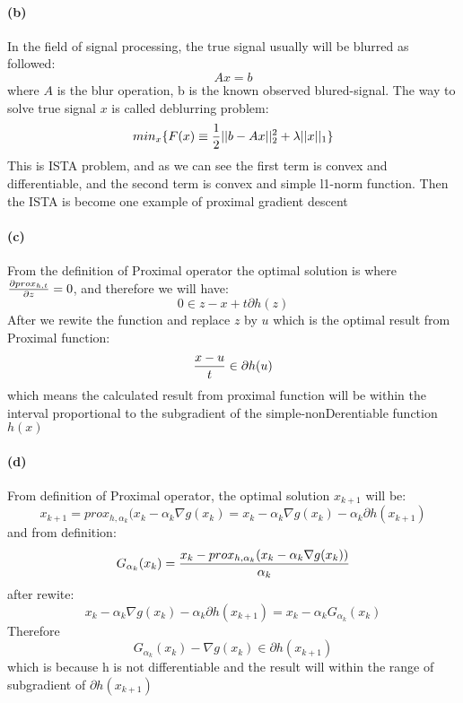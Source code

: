 \documentclass{article}
\begin{document}
\paragraph{(b)} In the field of signal processing, the true signal usually will be blurred as followed:
\begin{equation}
Ax = b
\end{equation}
where $A$ is the blur operation, b is the known observed blured-signal. The way to solve true signal $x$ is called deblurring problem:
\begin{equation}
min_x\{F(x) \equiv {1\over 2}||b-Ax||_2^2 + \lambda||x||_1\}
\end{equation}
This is ISTA problem, and as we can see the first term is convex and differentiable, and the second term is convex and simple l1-norm function. Then the ISTA is become one example of proximal gradient descent\\
\paragraph{(c)} From the definition of Proximal operator the optimal solution is where ${\partial prox_{h,t}\over \partial z} = 0$, and therefore we will have:
\begin{equation}
0 \in z-x+t\partial h(z)
\end{equation}
After we rewite the function and replace $z$ by $u$ which is the optimal result from Proximal function:
\begin{equation}
{x-u \over t} \in \partial h(u)
\end{equation}
which means the calculated result from proximal function will be within the interval proportional to the subgradient of the simple-nonDerentiable function $h(x)$\\
\paragraph{(d)} From definition of Proximal operator, the optimal solution $x_{k+1}$ will be:
\begin{equation}
x_{k+1} = prox_{h,\alpha_k}(x_k - \alpha_k \nabla g(x_k) = x_k - \alpha_k \nabla g(x_k) - \alpha_k \partial h(x_{k+1})
\end{equation}
and from definition:
\begin{equation}
G_{\alpha_k}(x_k) = { x_k - prox_{h,\alpha_k}(x_k - \alpha_k \nabla g(x_k)) \over \alpha_k}
\end{equation}
after rewite:
\begin{equation}
x_k - \alpha_k \nabla g(x_k) - \alpha_k \partial h(x_{k+1}) = x_k - \alpha_k G_{\alpha_k}(x_k)
\end{equation}
Therefore
\begin{equation}
G_{\alpha_k}(x_k) - \nabla g(x_k) \in \partial h(x_{k+1})
\end{equation}
which is because h is not differentiable and the result will within the range of subgradient of $\partial h(x_{k+1})$
\end{document}
